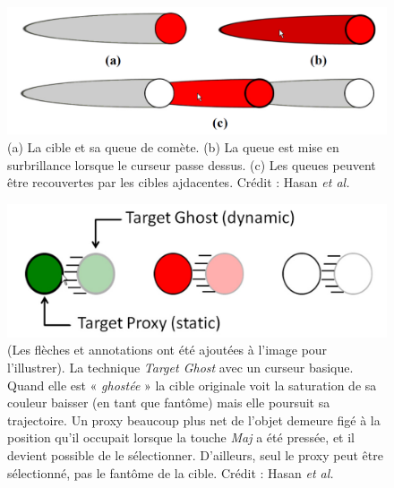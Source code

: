 	\begin{figure}[ht]
		\centering
		\includegraphics[width=\textwidth]{figures/comet}
		\caption{(a) La cible et sa queue de comète. (b) La queue est mise en surbrillance lorsque le curseur passe dessus. (c) Les queues peuvent être recouvertes par les cibles ajdacentes. Crédit : Hasan \emph{et al.}}
		\label{fig:comet}
	\end{figure}
	
	\begin{figure}[ht]
		\centering
		\includegraphics[width=\textwidth]{figures/targetGhost}
		\caption{(Les flèches et annotations ont été ajoutées à l'image pour l'illustrer). La technique \emph{Target Ghost} avec un curseur basique. Quand elle est « \emph{ghostée} » la cible originale voit la saturation de sa couleur baisser (en tant que fantôme) mais elle poursuit sa trajectoire. Un proxy beaucoup plus net de l'objet demeure figé à la position qu'il occupait lorsque la touche \emph{Maj} a été pressée, et il devient possible de le sélectionner. D'ailleurs, seul le proxy peut être sélectionné, pas le fantôme de la cible. Crédit : Hasan \emph{et al.}}
		\label{fig:targetGhost}
	\end{figure}
	
